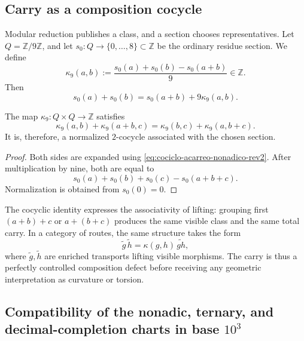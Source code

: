 \subsection{Carry as a composition cocycle}

Modular reduction publishes a class, and a section chooses representatives.
Let \(Q=\mathbb Z/9\mathbb Z\), and let
\(s_0:Q\to\{0,\ldots,8\}\subset\mathbb Z\) be the ordinary residue section.
We define
\begin{equation}
 \kappa_9(a,b)
 :=\frac{s_0(a)+s_0(b)-s_0(a+b)}{9}\in\mathbb Z.
 \label{eq:cociclo-acarreo-nonadico-rev2}
\end{equation}
Then
\[
 s_0(a)+s_0(b)=s_0(a+b)+9\kappa_9(a,b).
\]

\begin{proposition}
\label{prop:acarreo-dos-cociclo-rev2}
The map \(\kappa_9:Q\times Q\to\mathbb Z\) satisfies
\begin{equation}
 \kappa_9(a,b)+\kappa_9(a+b,c)
 =\kappa_9(b,c)+\kappa_9(a,b+c).
 \label{eq:identidad-dos-cociclo-rev2}
\end{equation}
It is, therefore, a normalized \(2\)-cocycle associated with the chosen section.
\end{proposition}

\begin{proof}
Both sides are expanded using
\eqref{eq:cociclo-acarreo-nonadico-rev2}. After multiplication by nine, both
are equal to
\[
 s_0(a)+s_0(b)+s_0(c)-s_0(a+b+c).
\]
Normalization is obtained from \(s_0(0)=0\).
\end{proof}

The cocyclic identity expresses the associativity of lifting: grouping first
\((a+b)+c\) or \(a+(b+c)\) produces the same visible class and the same total
carry. In a category of routes, the same structure takes the form
\[
 \widetilde g\,\widetilde h
 =\kappa(g,h)\,\widetilde{gh},
\]
where \(\widetilde g,\widetilde h\) are enriched transports lifting
visible morphisms. The carry is thus a perfectly controlled composition
defect before receiving any geometric interpretation as
curvature or torsion.

\subsection{Compatibility of the nonadic, ternary, and decimal-completion charts in base \texorpdfstring{\(10^3\)}{10^3}}
\label{subsec:compatibilidad-lectores-9-3-1000-rev3}

